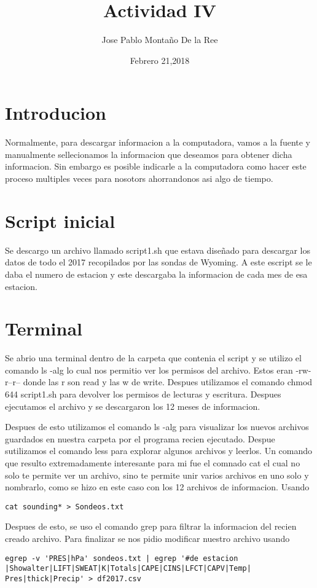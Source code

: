 \documentclass[a4paper]{article}
\title{Actividad IV}
\author{Jose Pablo Montaño De la Ree}
\date{Febrero 21,2018}
\begin{document}
\maketitle


\section{Introducion}

Normalmente, para descargar informacion a la computadora, vamos a la fuente y manualmente sellecionamos la informacion que deseamos para obtener dicha informacion. Sin embargo es posible indicarle a la computadora como hacer este proceso multiples veces para nosotors ahorrandonos asi algo de tiempo.

\section{Script inicial}

Se descargo un archivo llamado script1.sh que estava diseñado para descargar los datos de todo el 2017 recopilados por las sondas de Wyoming. A este escript se le daba el numero de estacion y este descargaba la informacion de cada mes de esa estacion.



\section{Terminal}

Se abrio una terminal dentro de la carpeta que contenia el script y se utilizo el comando ls -alg lo cual nos permitio ver los permisos del archivo. Estos eran -rw-r--r-- donde las r son read y las w de write. Despues utilizamos el comando chmod 644 script1.sh para devolver los permisos de lecturas y escritura. Despues ejecutamos el archivo y se descargaron los 12 meses de informacion. 
\linebreak 

Despues de esto utilizamos el comando ls -alg para visualizar los nuevos archivos guardados en nuestra carpeta por el programa recien ejecutado. Despue sutilizamos el comando less para explorar algunos archivos y leerlos. 
\linebreak 
Un comando que resulto extremadamente interesante para mi fue el comnado cat el cual no solo te permite ver un archivo, sino te permite unir varios archivos en uno solo y nombrarlo, como se hizo en este caso con los 12 archivos de informacion. Usando 
\begin{verbatim}
cat sounding* > Sondeos.txt
\end{verbatim}
 Despues de esto, se uso el comando grep para filtrar la informacion del recien creado archivo. Para finalizar se nos pidio modificar nuestro archivo usando 
\begin{verbatim}
egrep -v 'PRES|hPa' sondeos.txt | egrep '#de estacion
|Showalter|LIFT|SWEAT|K|Totals|CAPE|CINS|LFCT|CAPV|Temp|
Pres|thick|Precip' > df2017.csv
\end{verbatim}
\end{document}
